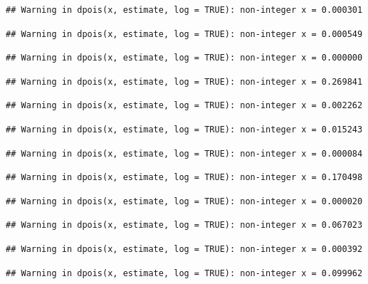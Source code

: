 \documentclass[]{article}
\begin{document}
\begin{verbatim}
## Warning in dpois(x, estimate, log = TRUE): non-integer x = 0.000301
\end{verbatim}

\begin{verbatim}
## Warning in dpois(x, estimate, log = TRUE): non-integer x = 0.000549
\end{verbatim}

\begin{verbatim}
## Warning in dpois(x, estimate, log = TRUE): non-integer x = 0.000000
\end{verbatim}

\begin{verbatim}
## Warning in dpois(x, estimate, log = TRUE): non-integer x = 0.269841
\end{verbatim}

\begin{verbatim}
## Warning in dpois(x, estimate, log = TRUE): non-integer x = 0.002262
\end{verbatim}

\begin{verbatim}
## Warning in dpois(x, estimate, log = TRUE): non-integer x = 0.015243
\end{verbatim}

\begin{verbatim}
## Warning in dpois(x, estimate, log = TRUE): non-integer x = 0.000084
\end{verbatim}

\begin{verbatim}
## Warning in dpois(x, estimate, log = TRUE): non-integer x = 0.170498
\end{verbatim}

\begin{verbatim}
## Warning in dpois(x, estimate, log = TRUE): non-integer x = 0.000020
\end{verbatim}

\begin{verbatim}
## Warning in dpois(x, estimate, log = TRUE): non-integer x = 0.067023
\end{verbatim}

\begin{verbatim}
## Warning in dpois(x, estimate, log = TRUE): non-integer x = 0.000392
\end{verbatim}

\begin{verbatim}
## Warning in dpois(x, estimate, log = TRUE): non-integer x = 0.099962
\end{verbatim}
\end{document}
